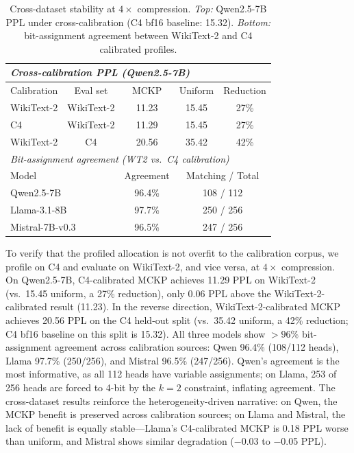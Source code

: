 \begin{table}[t]
\centering
\small
\caption{Cross-dataset stability at $4\times$ compression. \textit{Top:} Qwen2.5-7B PPL under cross-calibration (C4 bf16 baseline: 15.32). \textit{Bottom:} bit-assignment agreement between WikiText-2 and C4 calibrated profiles.}
\label{tab:cross_dataset}
\begin{tabular}{lcccc}
\toprule
\multicolumn{5}{l}{\textit{Cross-calibration PPL (Qwen2.5-7B)}} \\
\midrule
Calibration & Eval set & MCKP & Uniform & Reduction \\
\midrule
WikiText-2 & WikiText-2 & 11.23 & 15.45 & 27\% \\
C4         & WikiText-2 & 11.29 & 15.45 & 27\% \\
WikiText-2 & C4         & 20.56 & 35.42 & 42\% \\
\midrule
\multicolumn{5}{l}{\textit{Bit-assignment agreement (WT2 vs.\ C4 calibration)}} \\
\midrule
\multicolumn{2}{l}{Model} & Agreement & \multicolumn{2}{c}{Matching / Total} \\
\midrule
\multicolumn{2}{l}{Qwen2.5-7B}      & 96.4\% & \multicolumn{2}{c}{108 / 112} \\
\multicolumn{2}{l}{Llama-3.1-8B}    & 97.7\% & \multicolumn{2}{c}{250 / 256} \\
\multicolumn{2}{l}{Mistral-7B-v0.3} & 96.5\% & \multicolumn{2}{c}{247 / 256} \\
\bottomrule
\end{tabular}
\end{table}

To verify that the profiled allocation is not overfit to the calibration corpus, we profile on C4 and evaluate on WikiText-2, and vice versa, at $4\times$ compression.
On Qwen2.5-7B, C4-calibrated MCKP achieves 11.29 PPL on WikiText-2 (vs.\ 15.45 uniform, a 27\% reduction), only 0.06 PPL above the WikiText-2-calibrated result (11.23).
In the reverse direction, WikiText-2-calibrated MCKP achieves 20.56 PPL on the C4 held-out split (vs.\ 35.42 uniform, a 42\% reduction; C4 bf16 baseline on this split is 15.32).
All three models show ${>}96\%$ bit-assignment agreement across calibration sources: Qwen 96.4\% (108/112 heads), Llama 97.7\% (250/256), and Mistral 96.5\% (247/256).
Qwen's agreement is the most informative, as all 112 heads have variable assignments; on Llama, 253 of 256 heads are forced to 4-bit by the $k{=}2$ constraint, inflating agreement.
The cross-dataset results reinforce the heterogeneity-driven narrative: on Qwen, the MCKP benefit is preserved across calibration sources; on Llama and Mistral, the lack of benefit is equally stable---Llama's C4-calibrated MCKP is 0.18 PPL worse than uniform, and Mistral shows similar degradation ($-$0.03 to $-$0.05 PPL).

